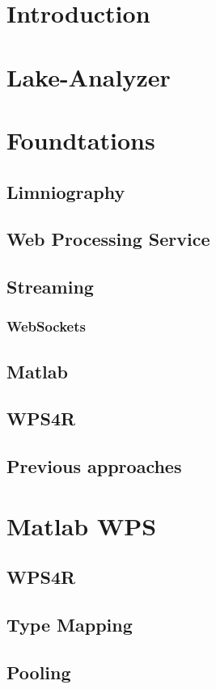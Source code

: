 \section{Introduction}
	\section{Lake-Analyzer}
	\section{Foundtations}
		\subsection{Limniography}
		\subsection{Web Processing Service}
		\subsection{Streaming}
			\subsubsection{WebSockets}
		\subsection{Matlab}
		\subsection{WPS4R}
		\subsection{Previous approaches}
	\section{Matlab WPS}
		\subsection{WPS4R}
		\subsection{Type Mapping}
		\subsection{Pooling}
